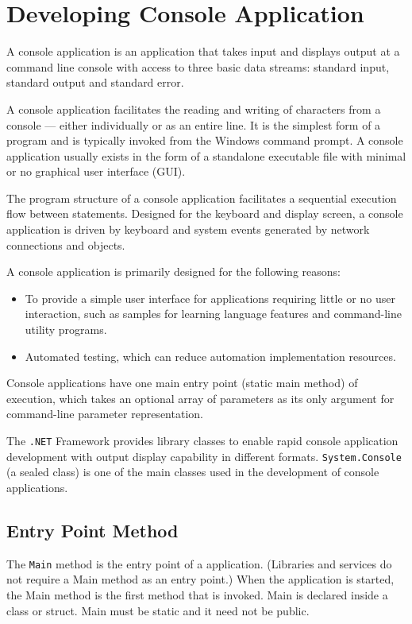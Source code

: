 \chapter{Developing Console Application}

A console application is an application that takes input and displays output at a command line console with access to three basic data streams: standard input, standard output and standard error. 

A console application facilitates the reading and writing of characters from a console — either individually or as an entire line. It is the simplest form of a {\cs} program and is typically invoked from the Windows command prompt. A console application usually exists in the form of a standalone executable file with minimal or no graphical user interface (GUI).

The program structure of a console application facilitates a sequential execution flow between statements. Designed for the keyboard and display screen, a console application is driven by keyboard and system events generated by network connections and objects.

A console application is primarily designed for the following reasons:
\begin{itemize}
	\item To provide a simple user interface for applications requiring little or no user interaction, such as samples for learning {\cs} language features and command-line utility programs.
	\item Automated testing, which can reduce automation implementation resources.
\end{itemize}

Console applications have one main entry point (static main method) of execution, which takes an optional array of parameters as its only argument for command-line parameter representation.

The \verb|.NET| Framework provides library classes to enable rapid console application development with output display capability in different formats. \verb|System.Console| (a sealed class) is one of the main classes used in the development of console applications.

\section{Entry Point Method}

The \verb|Main| method is the entry point of a {\cs} application. (Libraries and services do not require a Main method as an entry point.) When the application is started, the Main method is the first method that is invoked. Main is declared inside a class or struct. Main must be static and it need not be public. 

